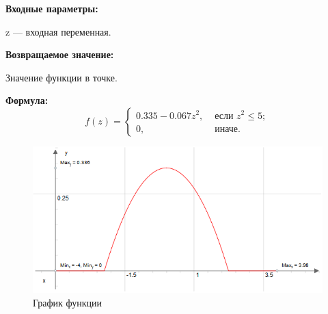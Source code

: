 \textbf{Входные параметры:}
 
z --- входная переменная.

\textbf{Возвращаемое значение:}
 
Значение функции в точке.

\textbf{Формула:}
\begin{equation*}
f\left(z \right)=\left\lbrace \begin{aligned} 0.335-0.067z^2,& \text{ если } z^2\leq 5 ; \\ 0,& \text{ иначе}. \end{aligned}\right.
\end{equation*}

 \begin{figure} [h] 
   \center
   \includegraphics {MHL_BellShapedKernelParabola_Graph.png}
   \caption{График функции} 
   \label{img:MHL_BellShapedKernelParabola_Graph}  
 \end{figure}
